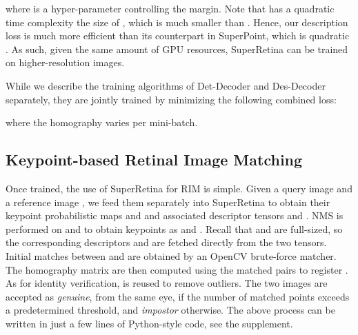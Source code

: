 where  is a hyper-parameter controlling the margin. Note that  has a quadratic time complexity \wrt the size of , which is much smaller than . Hence, our description loss is much more efficient than its counterpart in SuperPoint, which is quadratic  \wrt   . As such, given the same amount of GPU resources, SuperRetina can be trained on higher-resolution images.

While we describe the training algorithms of Det-Decoder and Des-Decoder separately, they are jointly trained by minimizing the following combined loss:

where the homography  varies per mini-batch.  


\subsection{Keypoint-based Retinal Image Matching} \label{ssec:tasks}

Once trained, the use of SuperRetina for RIM is simple. Given a query image  and a reference image , we feed them separately into SuperRetina to obtain their keypoint probabilistic maps  and  and associated descriptor tensors  and . NMS is performed on  and  to obtain keypoints as  and . Recall that  and  are full-sized, so the corresponding descriptors  and  are fetched directly from the two tensors. Initial matches between  and  are obtained by an OpenCV brute-force matcher. The homography matrix  are then computed using the matched pairs to register  \wrt . As for identity verification,  is reused to remove outliers. The two images are accepted as \emph{genuine}, \ie from the same eye, if the number of matched points exceeds a predetermined threshold, and \emph{impostor} otherwise. The above process can be written in just a few lines of Python-style code, see the supplement. 

